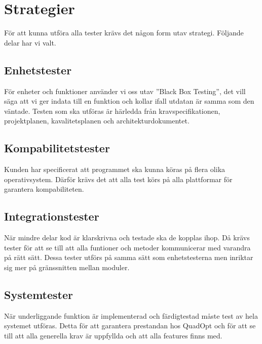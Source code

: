 \section{Strategier}
För att kunna utföra alla tester krävs det någon form utav strategi. Följande delar har vi valt.

\subsection{Enhetstester}
För enheter och funktioner använder vi oss utav ''Black Box Testing'', det vill säga att vi ger indata till en funktion och kollar ifall utdatan är samma som den väntade. Testen som ska utföras är härledda från kravspecifikationen, projektplanen, kavalitetsplanen och architekturdokumentet.

\subsection{Kompabilitetstester}
Kunden har specificerat att programmet ska kunna köras på flera olika operativsystem. Därför krävs det att alla test körs på alla plattformar för garantera kompabiliteten.

\subsection{Integrationstester}
När mindre delar kod är klarskrivna och testade ska de kopplas ihop. Då krävs tester för att se till att alla funtioner och metoder kommunicerar med varandra på rätt sätt. Dessa tester utförs på samma sätt som enhetstesterna men inriktar sig mer på gränssnitten mellan moduler.

\subsection{Systemtester}
När underliggande funktion är implementerad och färdigtestad måste test av hela systemet utföras. Detta för att garantera prestandan hos QuadOpt och för att se till att alla generella krav är uppfyllda och att alla features finns med. 
